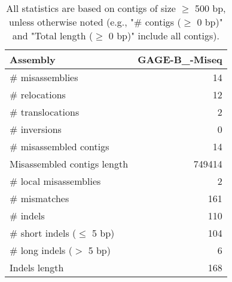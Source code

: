 \documentclass[12pt,a4paper]{article}
\begin{document}
\begin{table}[ht]
\begin{center}
\caption{All statistics are based on contigs of size $\geq$ 500 bp, unless otherwise noted (e.g., "\# contigs ($\geq$ 0 bp)" and "Total length ($\geq$ 0 bp)" include all contigs).}
\begin{tabular}{|l*{1}{|r}|}
\hline
Assembly & GAGE-B\_-Miseq \\ \hline
\# misassemblies & 14 \\ \hline
\hspace{5mm}\# relocations & 12 \\ \hline
\hspace{5mm}\# translocations & 2 \\ \hline
\hspace{5mm}\# inversions & 0 \\ \hline
\# misassembled contigs & 14 \\ \hline
Misassembled contigs length & 749414 \\ \hline
\# local misassemblies & 2 \\ \hline
\# mismatches & 161 \\ \hline
\# indels & 110 \\ \hline
\hspace{5mm}\# short indels ($\leq$ 5 bp) & 104 \\ \hline
\hspace{5mm}\# long indels ($>$ 5 bp) & 6 \\ \hline
Indels length & 168 \\ \hline
\end{tabular}
\end{center}
\end{table}
\end{document}
